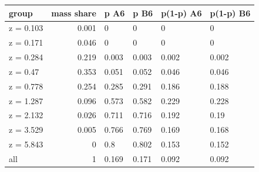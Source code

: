 \begingroup\small
\setlength{\tabcolsep}{3pt}
\renewcommand{\arraystretch}{1.04}
\begin{tabularx}{\linewidth}{XrXXXX}
\toprule
group & mass share & p A6 & p B6 & p(1-p) A6 & p(1-p) B6 \\
\midrule
z = 0.103 & 0.001 & 0 & 0 & 0 & 0 \\
z = 0.171 & 0.046 & 0 & 0 & 0 & 0 \\
z = 0.284 & 0.219 & 0.003 & 0.003 & 0.002 & 0.002 \\
z = 0.47 & 0.353 & 0.051 & 0.052 & 0.046 & 0.046 \\
z = 0.778 & 0.254 & 0.285 & 0.291 & 0.186 & 0.188 \\
z = 1.287 & 0.096 & 0.573 & 0.582 & 0.229 & 0.228 \\
z = 2.132 & 0.026 & 0.711 & 0.716 & 0.192 & 0.19 \\
z = 3.529 & 0.005 & 0.766 & 0.769 & 0.169 & 0.168 \\
z = 5.843 & 0 & 0.8 & 0.802 & 0.153 & 0.152 \\
all & 1 & 0.169 & 0.171 & 0.092 & 0.092 \\
\bottomrule
\end{tabularx}
\endgroup
